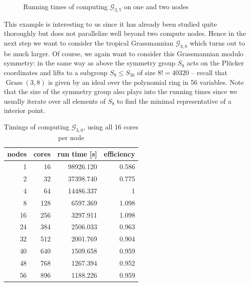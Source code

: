 \documentclass[
  paper=a4,
  titlepage,
  bibliography=totoc,
  pagesize=pdftex
]{scrartcl}
\numberwithin{figure}{section}
\numberwithin{equation}{section}
\numberwithin{table}{section}
\DeclareMathOperator{\Grass}{Grass}
\theoremstyle{definition}
\numberwithin{definition}{section}
\begin{document}
\begin{figure}[htbp]
  \begin{center}
    
  \end{center}
  \caption{Running times of computing $\mathcal{G}_{3,7}$ on one and two nodes}
  \label{fig:g37sc}
\end{figure}

This example is interesting to us since it has already been studied quite thoroughly but
does not parallelize well beyond two compute nodes. Hence in the next step we want to
consider the tropical Grassmannian $\mathcal G_{3,8}$ which turns out to be much larger.
Of course, we again want to consider this Grassmannian modulo symmetry: in the same way as
above the symmetry group $S_8$ acts on the Plücker coordinates and lifts to a subgroup
$S_8 \leq S_{56}$ of size $8!=40320$ -- recall that $\Grass(3,8)$ is given by an ideal
over the polynomial ring in 56 variables. Note that the size of the symmetry group also
plays into the running times since we usually iterate over all elements of $S_8$ to find
the minimal representative of a interior point.

\begin{table}[tbh]
  \centering
  \begin{tabular}{r|r||r|r}
    \textbf{nodes} & \textbf{cores} & \textbf{run time [s]} & \textbf{efficiency} \\
    \hline
     1 &  16 & 98926.120 & 0.586 \\
     2 &  32 & 37398.740 & 0.775 \\
     4 &  64 & 14486.337 & 1     \\
     8 & 128 &  6597.369 & 1.098 \\
    16 & 256 &  3297.911 & 1.098 \\
    24 & 384 &  2506.033 & 0.963 \\
    32 & 512 &  2001.769 & 0.904 \\
    40 & 640 &  1509.658 & 0.959 \\
    48 & 768 &  1267.394 & 0.952 \\
    56 & 896 &  1188.226 & 0.959
  \end{tabular}
  \caption{Timings of computing $\mathcal G_{3,8}$, using all 16 cores per node}
  \label{tab:g38}
\end{table}
\end{document}
